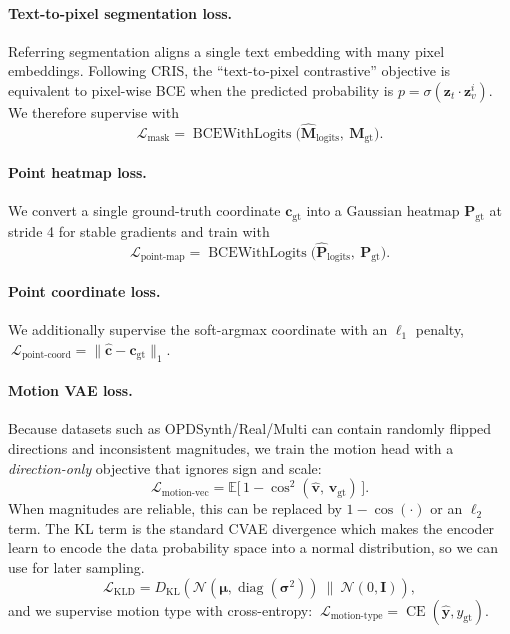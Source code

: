 \paragraph{Text-to-pixel segmentation loss.} Referring segmentation aligns a single text embedding with many pixel embeddings. Following CRIS, the ``text-to-pixel contrastive'' objective is equivalent to pixel-wise BCE when the predicted probability is $p=\sigma(\mathbf{z}_t\!\cdot\!\mathbf{z}_v^i)$. We therefore supervise with
\[
\mathcal{L}_{\text{mask}}=\operatorname{BCEWithLogits}\!\Big(\hat{\mathbf{M}}_{\text{logits}},\ \mathbf{M}_{\text{gt}}\Big).
\]

\paragraph{Point heatmap loss.} We convert a single ground-truth coordinate $\mathbf{c}_{\text{gt}}$ into a Gaussian heatmap $\mathbf{P}_{\text{gt}}$ at stride 4 for stable gradients and train with
\[
\mathcal{L}_{\text{point-map}}=\operatorname{BCEWithLogits}\!\Big(\hat{\mathbf{P}}_{\text{logits}},\ \mathbf{P}_{\text{gt}}\Big).
\]

\paragraph{Point coordinate loss.} We additionally supervise the soft-argmax coordinate with an $\ell_1$ penalty, $\ \mathcal{L}_{\text{point-coord}}=\|\hat{\mathbf{c}}-\mathbf{c}_{\text{gt}}\|_1$.

\paragraph{Motion VAE loss.} Because datasets such as OPDSynth/Real/Multi can contain randomly flipped directions and inconsistent magnitudes, we train the motion head with a \emph{direction-only} objective that ignores sign and scale:
\[
\mathcal{L}_{\text{motion-vec}}=\mathbb{E}\big[\,1-\cos^2(\hat{\mathbf{v}},\,\mathbf{v}_{\text{gt}})\,\big].
\]
When magnitudes are reliable, this can be replaced by $1-\cos(\cdot)$ or an $\ell_2$ term. The KL term is the standard CVAE divergence which makes the encoder learn to encode the data probability space into a normal distribution, so we can use for later sampling.
\[
\mathcal{L}_{\text{KLD}}=D_{\text{KL}}\!\left(\mathcal{N}(\boldsymbol{\mu},\operatorname{diag}(\boldsymbol{\sigma}^2))\ \big\|\ \mathcal{N}(0,\mathbf{I})\right),
\]
and we supervise motion type with cross-entropy: $\ \mathcal{L}_{\text{motion-type}}=\operatorname{CE}(\hat{\mathbf{y}},y_{\text{gt}})$.

